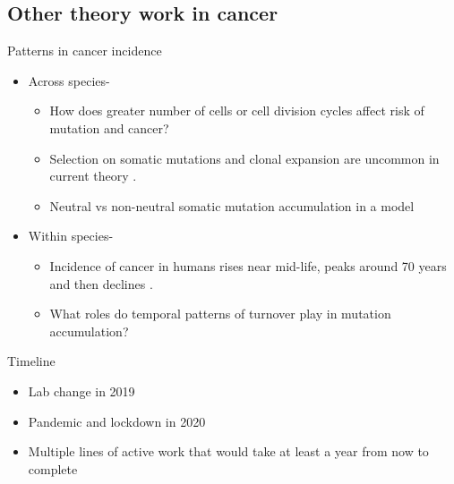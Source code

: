 \documentclass{beamer}
\begin{document}
\subsection{Other theory work in cancer}
\begin{frame}{Patterns in cancer incidence}
\begin{itemize}
	\item<1-> Across species-
	\begin{itemize}
		\item<2-> How does greater number of cells or cell division cycles affect risk of mutation and cancer?
		\item<2-> Selection on somatic mutations and clonal expansion are uncommon in current theory \citep{Nowell1976}.
		\item<2-> Neutral vs non-neutral somatic mutation accumulation in a model
	\end{itemize}
\end{itemize}

\begin{itemize}
	\item<3-> Within species-
	\begin{itemize}
		\item<4-> Incidence of cancer in humans rises near mid-life, peaks around 70 years and then declines \citep{Harding2012}.
		\item<5-> What roles do temporal patterns of turnover play in mutation accumulation? \citep{Rozhok2019}
	\end{itemize}
\end{itemize}

\end{frame}

\begin{frame}{Timeline}
	\begin{itemize}
		\item Lab change in 2019
		\item Pandemic and lockdown in 2020
		\item Multiple lines of active work that would take at least a year from now to complete
	\end{itemize}
\end{frame}



\begin{frame}
\end{frame}
\end{document}
